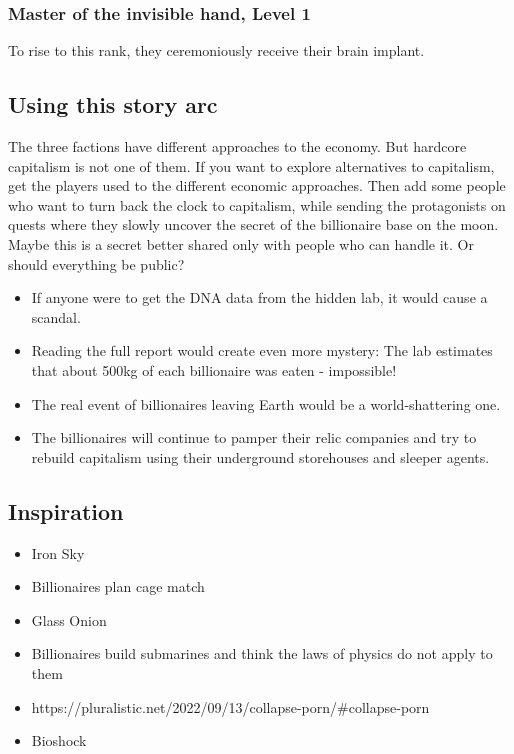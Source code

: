 \subsubsection{Master of the invisible hand, Level 1}

To rise to this rank, they ceremoniously receive their brain implant.


\subsection{Using this story arc}

The three factions have different approaches to the economy. But hardcore capitalism is not one of them. If you want to explore alternatives to capitalism, get the players used to the different economic approaches. Then add some people who want to turn back the clock to capitalism, while sending the protagonists on quests where they slowly uncover the secret of the billionaire base on the moon.
Maybe this is a secret better shared only with people who can handle it. Or should everything be public?

\begin{itemize}
    \item If anyone were to get the DNA data from the hidden lab, it would cause a scandal.
    \item Reading the full report would create even more mystery: The lab estimates that about 500kg of each billionaire was eaten - impossible!
    \item The real event of billionaires leaving Earth would be a world-shattering one.
    \item The billionaires will continue to pamper their relic companies and try to rebuild capitalism using their underground storehouses and sleeper agents.
\end{itemize}


\subsection{Inspiration}

\begin{itemize}
    \item Iron Sky
    \item Billionaires plan cage match
    \item Glass Onion
    \item Billionaires build submarines and think the laws of physics do not apply to them
    \item https://pluralistic.net/2022/09/13/collapse-porn/#collapse-porn
    \item Bioshock
\end{itemize}








